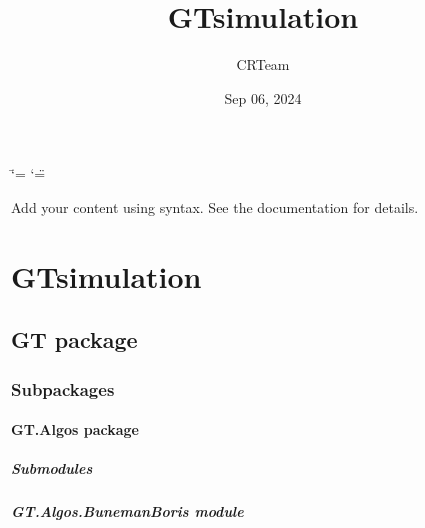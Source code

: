 \documentclass[letterpaper,10pt,english]{sphinxmanual}
\title{GTsimulation}
\date{Sep 06, 2024}
\author{CRTeam}
\begin{document}
\ifdefined\shorthandoff
  \ifnum\catcode`\=\string=\active\shorthandoff{=}\fi
  \ifnum\catcode`\"=\active{}\fi
\fi

\pagestyle{empty}
\sphinxmaketitle
\pagestyle{plain}
\sphinxtableofcontents
\pagestyle{normal}
\label{\detokenize{index::doc}}


\sphinxAtStartPar
Add your content using  syntax. See the
documentation for details.

\sphinxstepscope


\chapter{GTsimulation}
\label{\detokenize{modules:gtsimulation}}\label{\detokenize{modules::doc}}
\sphinxstepscope


\section{GT package}
\label{\detokenize{GT:gt-package}}\label{\detokenize{GT::doc}}

\subsection{Subpackages}
\label{\detokenize{GT:subpackages}}
\sphinxstepscope


\subsubsection{GT.Algos package}
\label{\detokenize{GT.Algos:gt-algos-package}}\label{\detokenize{GT.Algos::doc}}

\paragraph{Submodules}
\label{\detokenize{GT.Algos:submodules}}

\paragraph{GT.Algos.BunemanBoris module}
\label{\detokenize{GT.Algos:module-GT.Algos.BunemanBoris}}\label{\detokenize{GT.Algos:gt-algos-bunemanboris-module}}
\end{document}
